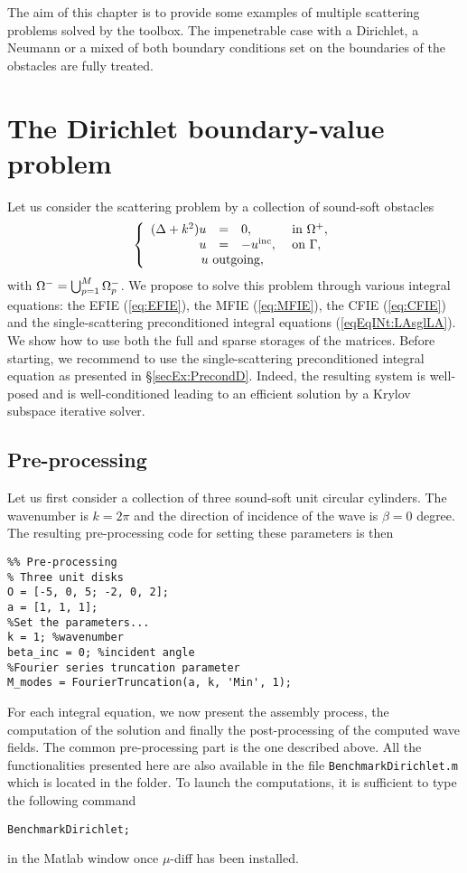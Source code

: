 The aim of this chapter is to provide some examples of multiple scattering problems solved by  the \mudiff toolbox.
The impenetrable case with a Dirichlet, a Neumann or a mixed of both boundary conditions  set on the boundaries of the obstacles are
fully treated.


\section{The Dirichlet boundary-value problem}

Let us consider the scattering problem by a collection of sound-soft obstacles
$$
\left\{\begin{array}{r c l l}
(\Delta +k^2)u & = & 0, & \text{ in }\Omegaps,\\
u & = & -\uinc, & \text{ on }\Gamma,\\
\multicolumn{4}{l}{\qquad \qquad u \text{ outgoing},}
\end{array}\right.
$$
with  $\Omega^- = \bigcup_{p=1}^{M}\Omega_p^-$.
We propose to solve this problem through various integral equations: the EFIE (\ref{eq:EFIE}), the MFIE (\ref{eq:MFIE}), the 
CFIE (\ref{eq:CFIE}) and the single-scattering preconditioned integral equations (\ref{eqEqINt:LAsglLA}). We show how
 to use both the full and  sparse storages of the matrices.
Before starting, we recommend to use the  single-scattering preconditioned integral equation as presented in \S\ref{secEx:PrecondD}. 
Indeed, the resulting system is well-posed and is well-conditioned leading to an efficient solution by a Krylov subspace iterative solver.

\subsection{Pre-processing}

Let us first consider a collection of three sound-soft unit circular cylinders. The  wavenumber is 
$k=2\pi$ and the direction of  incidence of the
 wave is $\beta = 0$ degree. The resulting  \mudiff pre-processing code for setting  these parameters is then
\begin{lstlisting}
%% Pre-processing
% Three unit disks 
O = [-5, 0, 5; -2, 0, 2];
a = [1, 1, 1];
%Set the parameters...
k = 1; %wavenumber
beta_inc = 0; %incident angle
%Fourier series truncation parameter
M_modes = FourierTruncation(a, k, 'Min', 1);
\end{lstlisting}

For each integral equation, we now present the assembly process, the computation of the solution and finally the post-processing of the computed wave
fields. 
The common pre-processing part is the one described above. All the functionalities presented here are also available in  the
 file \texttt{BenchmarkDirichlet.m} which is located in the   folder.
 To launch the computations, it is sufficient to type the following command
\begin{lstlisting}
BenchmarkDirichlet;
\end{lstlisting}
in the Matlab window once $\mu$-diff has been installed.

